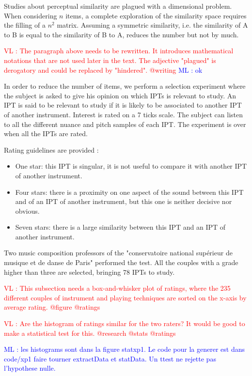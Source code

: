 \documentclass{article}
\makeatletter
\newcommand*{\ie}{i.e.\@\xspace}
\newcommand{\ipt}{IPT\xspace}
\newcommand{\ipts}{IPTs\xspace}
\newcommand{\ml}[1]{\textcolor{blue}{ML : #1}}
\newcommand{\vl}[1]{\textcolor{red}{VL : #1}}
\makeatother
\begin{document}
Studies about perceptual similarity are plagued with a dimensional problem.
When considering $n$ items, a complete exploration of the similarity space
requires the filling of a $n^2$ matrix. Assuming a symmetric similarity,
\ie{} the similarity of A to B is equal to the similarity of B to A,
reduces the number but not by much.

\vl{The paragraph above needs to be rewritten. It introduces mathematical
notations that are not used later in the text. The adjective "plagued"
is derogatory and could be replaced by "hindered". @writing}
\ml{ok}

In order to reduce the number of items, we perform a selection
experiment where the subject is asked to give his opinion on which
\ipts is relevant to study. An \ipt is said to be relevant to study
if it is likely to be associated to another \ipt of another instrument.
Interest is rated on a 7 ticks scale. The subject can listen to all the different
nuance and pitch samples of each \ipt. The experiment is over when all the
\ipts are rated.

Rating guidelines are provided :
\begin{itemize}
  \item One star: this \ipt is singular, it is not useful to compare it with another \ipt of another instrument.
  \item Four stars: there is a proximity on one aspect of the sound between this
  \ipt and of an \ipt of another instrument,
  but this one is neither decisive nor obvious.
  \item Seven stars: there is a large similarity between this \ipt and an \ipt of another instrument.
\end{itemize}

Two music composition professors of the
"conservatoire national sup\'erieur de musique et de danse de Paris" performed the test.
All the couples with a grade higher than three are selected,
bringing 78 \ipts to study.

\vl{This subsection needs a box-and-whisker plot of ratings, where the 235 different
couples of instrument and playing techniques are sorted on the x-axis by average rating. @figure @ratings}

\vl{Are the histogram of ratings similar for the two raters? It would be good to make a statistical test for this. @research @stats @ratings}

\ml{les histograms sont dans la figure statxp1. Le code pour la generer est dans code/xp1 faire tourner extractData et statData. Un ttest ne rejette pas l'hypothese nulle.}
\end{document}
